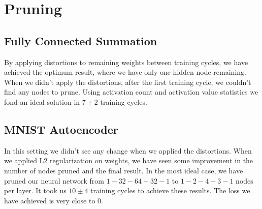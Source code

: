 \section{Pruning}
\subsection{Fully Connected Summation}
By applying distortions to remaining weights between training cycles, we have achieved the optimum result, where we have only one hidden node remaining. When we didn't apply the distortions, after the first training cycle, we couldn't find any nodes to prune. Using activation count and activation value statistics we fond an ideal solution in $7 \pm 2$ training cycles.

\subsection{MNIST Autoencoder}
In this setting we didn't see any change when we applied the distortions. When we applied L2 regularization on weights, we have seen some improvement in the number of nodes pruned and the final result. In the most ideal case, we have pruned our neural network from $1-32-64-32-1$ to $1-2-4-3-1$ nodes per layer. It took us $10\pm4$ training cycles to achieve these results. The loss we have achieved is very close to 0. 


